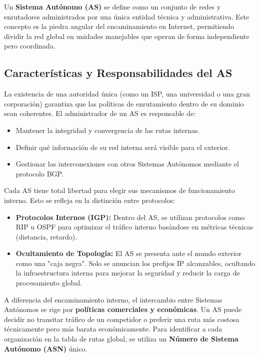 Un \textbf{Sistema Autónomo (AS)} se define como un conjunto de redes y enrutadores administrados por una única entidad técnica y administrativa. Este concepto es la piedra angular del encaminamiento en Internet, permitiendo dividir la red global en unidades manejables que operan de forma independiente pero coordinada.

\subsection{Características y Responsabilidades del AS}

La existencia de una autoridad única (como un ISP, una universidad o una gran corporación) garantiza que las políticas de enrutamiento dentro de su dominio sean coherentes. El administrador de un AS es responsable de:

\begin{itemize}
	\item Mantener la integridad y convergencia de las rutas internas.
	\item Definir qué información de su red interna será visible para el exterior.
	\item Gestionar las interconexiones con otros Sistemas Autónomos mediante el protocolo BGP.
\end{itemize}

Cada AS tiene total libertad para elegir sus mecanismos de funcionamiento interno. Esto se refleja en la distinción entre protocolos:

\begin{itemize}
	\item \textbf{Protocolos Internos (IGP):} Dentro del AS, se utilizan protocolos como RIP u OSPF para optimizar el tráfico interno basándose en métricas técnicas (distancia, retardo).
	\item \textbf{Ocultamiento de Topología:} El AS se presenta ante el mundo exterior como una "caja negra". Solo se anuncian los prefijos IP alcanzables, ocultando la infraestructura interna para mejorar la seguridad y reducir la carga de procesamiento global.
\end{itemize}

A diferencia del encaminamiento interno, el intercambio entre Sistemas Autónomos se rige por \textbf{políticas comerciales y económicas}. Un AS puede decidir no transitar tráfico de un competidor o preferir una ruta más costosa técnicamente pero más barata económicamente. Para identificar a cada organización en la tabla de rutas global, se utiliza un \textbf{Número de Sistema Autónomo (ASN)} único.

